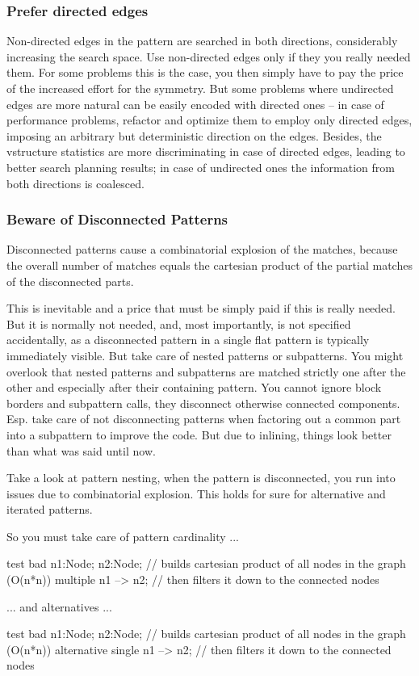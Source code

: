 
\subsubsection*{Prefer directed edges}
Non-directed edges in the pattern are searched in both directions, considerably increasing the search space.
Use non-directed edges only if they you really needed them.
For some problems this is the case, you then simply have to pay the price of the increased effort for the symmetry.
But some problems where undirected edges are more natural can be easily encoded with directed ones -- in case of performance problems, refactor and optimize them to employ only directed edges, imposing an arbitrary but deterministic direction on the edges.
Besides, the vstructure statistics are more discriminating in case of directed edges, leading to better search planning results; in case of undirected ones the information from both directions is coalesced.


\subsubsection*{Beware of Disconnected Patterns}
Disconnected patterns cause a combinatorial explosion of the matches, because the overall number of matches equals the cartesian product of the partial matches of the disconnected parts. 

This is inevitable and a price that must be simply paid if this is really needed.
But it is normally not needed, and, most importantly, is not specified accidentally, as a disconnected pattern in a single flat pattern is typically immediately visible.
But take care of nested patterns or subpatterns.
You might overlook that nested patterns and subpatterns are matched strictly one after the other and especially after their containing pattern.
You cannot ignore block borders and subpattern calls, they disconnect otherwise connected components.
Esp. take care of not disconnecting patterns when factoring out a common part into a subpattern to improve the code.
But due to inlining, things look better than what was said until now.

\begin{example}
Take a look at pattern nesting, when the pattern is disconnected, you run into issues due to combinatorial explosion.
This holds for sure for alternative and iterated patterns.

So you must take care of pattern cardinality ...
\begin{grgen}
test bad {
  n1:Node; n2:Node; // builds cartesian product of all nodes in the graph (O(n*n))
  multiple {
    n1 --> n2; // then filters it down to the connected nodes
  }
}
\end{grgen}
... and alternatives ...
\begin{grgen}
test bad {
  n1:Node; n2:Node; // builds cartesian product of all nodes in the graph (O(n*n))
  alternative {
    single {
      n1 --> n2; // then filters it down to the connected nodes
    }
  }
}
\end{grgen}
\end{example}

